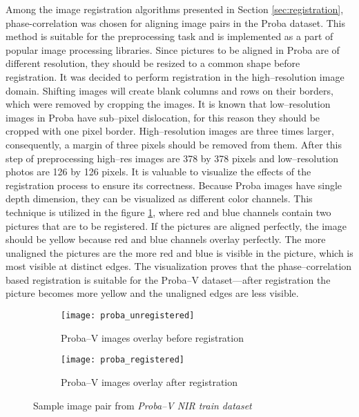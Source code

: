 Among the image registration algorithms presented in Section \ref{sec:registration}, phase-correlation was chosen for aligning image pairs in the Proba dataset.
This method is suitable for the preprocessing task and is implemented as a part of popular image processing libraries.
Since pictures to be aligned in Proba are of different resolution, they should be resized to a common shape before registration.
It was decided to perform registration in the high--resolution image domain.
Shifting images will create blank columns and rows on their borders, which were removed by cropping the images.
It is known that low--resolution images in Proba have sub--pixel dislocation, for this reason they should be cropped with one pixel border.
High--resolution images are three times larger, consequently, a margin of three pixels should be removed from them.
After this step of preprocessing high--res images are 378 by 378 pixels and low--resolution photos are 126 by 126 pixels.
It is valuable to visualize the effects of the registration process to ensure its correctness.
Because Proba images have single depth dimension, they can be visualized as different color channels.
This technique is utilized in the figure \ref{fig:proba-registration}, where red and blue channels contain two pictures that are to be registered.
If the pictures are aligned perfectly, the image should be yellow because red and blue channels overlay perfectly.
The more unaligned the pictures are the more red and blue is visible in the picture, which is most visible at distinct edges.
The visualization proves that the phase--correlation based registration is suitable for the Proba--V dataset---after registration the picture becomes more yellow and the unaligned edges are less visible.
\begin{figure}
    \begin{subfigure}{0.45\textwidth}
        \centering
        \texttt{[image: proba\_unregistered]}
        \caption{Proba--V images overlay before registration}
    \end{subfigure}
    \hfill
    \begin{subfigure}{0.45\textwidth}
        \centering
        \texttt{[image: proba\_registered]}
        \caption{Proba--V images overlay after registration}
    \end{subfigure}
    \caption{Sample image pair from \textit{Proba--V NIR train dataset}}
    \label{fig:proba-registration}
\end{figure}

